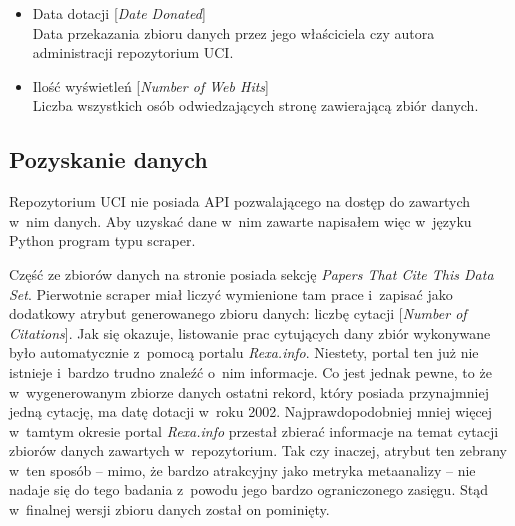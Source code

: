 \begin{itemize}
  \item Data dotacji [\emph{Date Donated}] \\
        Data przekazania zbioru danych przez jego właściciela czy autora administracji repozytorium UCI.

  \item Ilość wyświetleń [\emph{Number of Web Hits}] \\
        Liczba wszystkich osób odwiedzających stronę zawierającą zbiór danych.

\end{itemize}

\subsection{Pozyskanie danych}

Repozytorium UCI nie posiada API pozwalającego na dostęp do zawartych w~nim danych.
Aby uzyskać dane w~nim zawarte napisałem więc w~języku Python program typu scraper.

Część ze zbiorów danych na stronie posiada sekcję \emph{Papers That Cite This Data Set}.
Pierwotnie scraper miał liczyć wymienione tam prace i~zapisać jako dodatkowy atrybut generowanego zbioru danych: liczbę cytacji [\emph{Number of Citations}].
Jak się okazuje, listowanie prac cytujących dany zbiór wykonywane było automatycznie z~pomocą portalu \emph{Rexa.info}.
Niestety, portal ten już nie istnieje i~bardzo trudno znaleźć o~nim informacje.
Co jest jednak pewne, to że w~wygenerowanym zbiorze danych ostatni rekord, który posiada przynajmniej jedną cytację, ma datę dotacji w~roku 2002.
Najprawdopodobniej mniej więcej w~tamtym okresie portal \emph{Rexa.info} przestał zbierać informacje na temat cytacji zbiorów danych zawartych w~repozytorium.
Tak czy inaczej, atrybut ten zebrany w~ten sposób -- mimo, że bardzo atrakcyjny jako metryka metaanalizy -- nie nadaje się do tego badania z~powodu jego bardzo ograniczonego zasięgu.
Stąd w~finalnej wersji zbioru danych został on pominięty.

